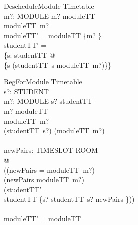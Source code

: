 \documentclass{article}
\begin{document}
\begin{schema}{DescheduleModule}
\Delta Timetable\\
m?: MODULE
\where
m? \in \dom moduleTT\\
moduleTT~m? \neq \emptyset\\
moduleTT' = moduleTT \oplus \{m? \mapsto \emptyset \} \\
studentTT' = \\
\bigcup \{s: \dom studentTT @ \\
 \{s \mapsto (studentTT~s \setminus moduleTT~m?)\}\}
\end{schema}

\begin{schema}{RegForModule}
\Delta Timetable\\
s?: STUDENT\\
m?: MODULE
\where
s? \in \dom studentTT\\
m? \in \dom moduleTT\\
moduleTT~m? \neq \emptyset \\
\dom (studentTT~s?) \cap \dom (moduleTT~m?) \neq \emptyset \\
{}\\
\exists newPairs: TIMESLOT \pfun ROOM \\
@ \\
((\dom newPairs = \dom moduleTT~m?)\\
\land (newPairs \subseteq moduleTT~m?)\\
\land (studentTT' = \\
 studentTT \oplus \{s? \mapsto studentTT~s? \cup newPairs \}))\\
{}\\
moduleTT' = moduleTT
\end{schema}
\end{document}
